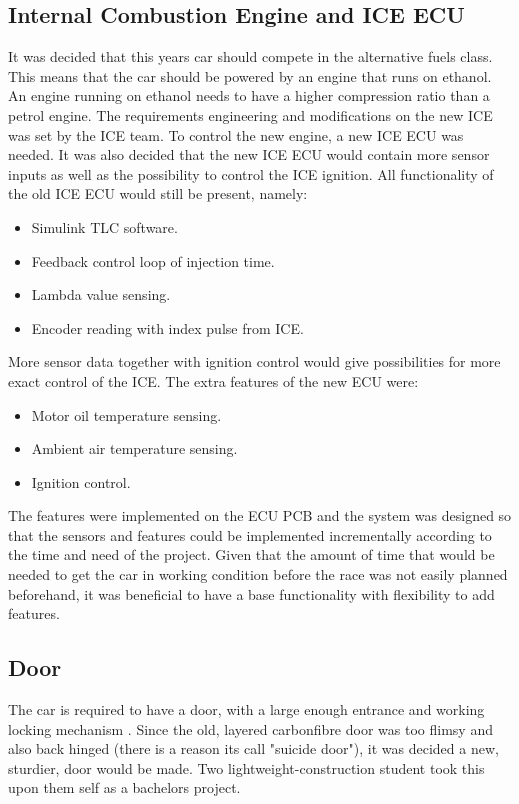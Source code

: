 \subsection{Internal Combustion Engine and ICE ECU}
It was decided that this years car should compete in the alternative fuels
class. This means that the car should be powered by an engine that runs on
ethanol. An engine running on ethanol needs to have a higher compression ratio than
a petrol engine.
The requirements engineering and modifications on the new ICE was set by the ICE
team. To control the new engine, a new ICE ECU was needed. It was also decided
that the new ICE ECU would contain more sensor inputs as well as the possibility
to control the ICE ignition. All functionality of the old ICE ECU would still be
present, namely:
\begin{itemize}
    \item Simulink TLC software.
    \item Feedback control loop of injection time.
    \item Lambda value sensing.
    \item Encoder reading with index pulse from ICE\@.
\end{itemize}
More sensor data together with ignition control would give possibilities
for more exact control of the ICE\@. The extra features of the new ECU were:
\begin{itemize}
    \item Motor oil temperature sensing.
    \item Ambient air temperature sensing.
    \item Ignition control.
\end{itemize}
The features were implemented on the ECU PCB and the system was designed so that
the sensors and features could be implemented incrementally according to the
time and need of the project. Given that the amount of time that would be needed
to get the car in working condition before the race was not easily planned
beforehand, it was beneficial to have a base functionality with flexibility to
add features.

\subsection{Door}
The car is required to have a door, with a large enough entrance and working locking mechanism \cite{semrules16c1}. Since the old, layered carbonfibre door was too flimsy and also back hinged (there is a reason its call "suicide door"), it was decided a new, sturdier, door would be made. Two lightweight-construction student took this upon them self as a bachelors project. 

